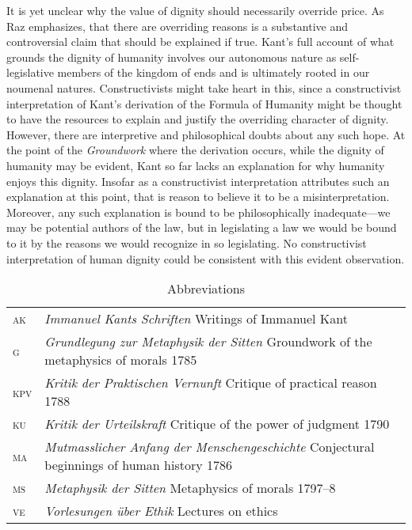 \documentclass[a4paper,12pt]{article}
\begin{document}
It is yet unclear why the value of dignity should necessarily override price. As Raz emphasizes, that there are overriding reasons is a substantive and controversial claim that should be explained if true. Kant's full account of what grounds the dignity of humanity involves our autonomous nature as self-le\-gis\-la\-tive members of the kingdom of ends and is ultimately rooted in our noumenal natures. Constructivists might take heart in this, since a constructivist interpretation of Kant's derivation of the Formula of Humanity might be thought to have the resources to explain and justify the overriding character of dignity. However, there are interpretive and philosophical doubts about any such hope. At the point of the \emph{Groundwork} where the derivation occurs, while the dignity of humanity may be evident, Kant so far lacks an explanation for why humanity enjoys this dignity. Insofar as a constructivist interpretation attributes such an explanation at this point, that is reason to believe it to be a misinterpretation. Moreover, any such explanation is bound to be philosophically inadequate---we may be potential authors of the law, but in legislating a law we would be bound to it by the reasons we would recognize in so legislating. No constructivist interpretation of human dignity could be consistent with this evident observation. 

\begin{table}
	[ht] \setlength{\abovecaptionskip}{0pt} \setlength{\belowcaptionskip}{10pt} \caption{Abbreviations} 
	\begin{tabular*}
		{\textwidth}{lp{}}
	    \textsc{ak} & \emph{Immanuel Kants Schriften} Writings of Immanuel Kant\\
		\textsc{g} & \emph{Grundlegung zur Metaphysik der Sitten} Groundwork of the metaphysics of morals 1785\\
		\textsc{kpv} & \emph{Kritik der Praktischen Vernunft} Critique of practical reason 1788\\
		\textsc{ku} & \emph{Kritik der Urteilskraft} Critique of the power of judgment 1790\\
		\textsc{ma} & \emph{Mutmasslicher Anfang der Menschengeschichte} Conjectural beginnings of human history 1786\\
		\textsc{ms} & \emph{Metaphysik der Sitten} Metaphysics of morals 1797--8\\
		\textsc{ve} & \emph{Vorlesungen \"uber Ethik} Lectures on ethics \\
	\end{tabular*}
\end{table}


 

\end{document}
